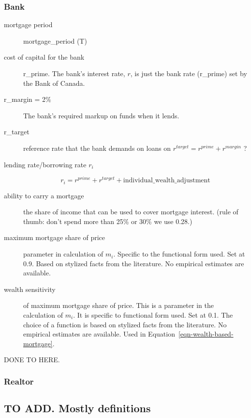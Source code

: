 \subsubsection{Bank} %
\begin{description}
\item [mortgage period]  mortgage\_period (T)
\item [cost of capital for the bank] r\_prime. The bank's interest rate, $r$, is just the bank rate (r\_prime) set by the Bank of Canada.  
\item [r\_margin = 2\%] The bank's required markup on funds when it lends.  
\item [r\_target] reference rate that the bank demands on loans on 
$ r^{target}= r^{prime} +r^{margin}$ ? 





\item[lending rate/borrowing rate $r_i$]  
\[r_i=r^{prime} + r^{target} + \mathrm{individual\_wealth\_adjustment}\]


\label{fig-capital-cost}

\item [{ability to carry a mortgage}] the share of income that can be used to cover mortgage interest. (rule of thumb: don't spend more than 25\% or 30\% we use 0.28.)
\item [maximum mortgage share of price] parameter in calculation of $m_i$. Specific to the functional form used. Set at 0.9. Based on stylized facts from the literature.  No empirical estimates are available.
\item[wealth sensitivity] of maximum mortgage share of price. This is a parameter in the calculation of $m_i$. It is specific to functional form used. Set at 0.1. The choice of a function is based on stylized facts from the literature.  No empirical estimates are available. Used in Equation~\ref{eqn-wealth-based-mortgage}.
\end{description}

DONE TO HERE.

\subsubsection{Realtor}


\subsection{TO ADD. Mostly definitions}

